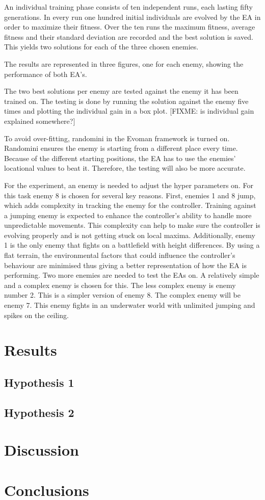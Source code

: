 An individual training phase consists of ten independent runs, each lasting fifty generations.
In every run one hundred initial individuals are evolved by the EA in order to maximize their fitness.
Over the ten runs the maximum fitness, average fitness and their standard deviation are recorded and the best solution is saved.
This yields two solutions for each of the three chosen enemies.

The results are represented in three figures, one for each enemy, showing the performance of both EA’s.

The two best solutions per enemy are tested against the enemy it has been trained on.
The testing is done by running the solution against the enemy five times and plotting the individual gain in a box plot.
[FIXME: is individual gain explained somewhere?]

To avoid over-fitting, randomini in the Evoman framework is turned on.
Randomini ensures the enemy is starting from a different place every time.
Because of the different starting positions, the EA has to use the enemies’ locational values to beat it.
Therefore, the testing will also be more accurate.

For the experiment, an enemy is needed to adjust the hyper parameters on.
For this task enemy 8 is chosen for several key reasons. First, enemies 1 and 8 jump, which adds complexity in tracking the enemy for the controller.
Training against a jumping enemy is expected to enhance the controller’s ability to handle more unpredictable movements.
This complexity can help to make sure the controller is evolving properly and is not getting stuck on local maxima.
Additionally, enemy 1 is the only enemy that fights on a battlefield with height differences.
By using a flat terrain, the environmental factors that could influence the controller’s behaviour are minimised thus giving a better representation of how the EA is performing.
Two more enemies are needed to test the EAs on. A relatively simple and a complex enemy is chosen for this.
The less complex enemy is enemy number 2.
This is a simpler version of enemy 8.
The complex enemy will be enemy 7.
This enemy fights in an underwater world with unlimited jumping and spikes on the ceiling.


\section{Results}
\subsection{Hypothesis 1}

\subsection{Hypothesis 2}


\section{Discussion}


\section{Conclusions}

